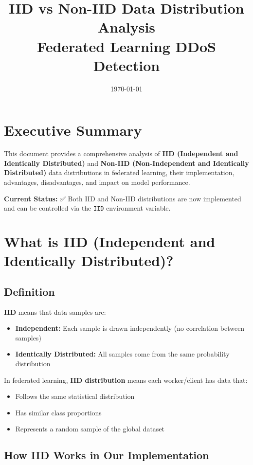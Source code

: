 \documentclass[12pt,a4paper]{article}
\title{IID vs Non-IID Data Distribution Analysis\\Federated Learning DDoS Detection}
\author{}
\date{\today}
\begin{document}
\maketitle

\section{Executive Summary}

This document provides a comprehensive analysis of \textbf{IID (Independent and Identically Distributed)} and \textbf{Non-IID (Non-Independent and Identically Distributed)} data distributions in federated learning, their implementation, advantages, disadvantages, and impact on model performance.

\textbf{Current Status:} ✅ Both IID and Non-IID distributions are now implemented and can be controlled via the \texttt{IID} environment variable.

\section{What is IID (Independent and Identically Distributed)?}

\subsection{Definition}

\textbf{IID} means that data samples are:
\begin{itemize}
    \item \textbf{Independent:} Each sample is drawn independently (no correlation between samples)
    \item \textbf{Identically Distributed:} All samples come from the same probability distribution
\end{itemize}

In federated learning, \textbf{IID distribution} means each worker/client has data that:
\begin{itemize}
    \item Follows the same statistical distribution
    \item Has similar class proportions
    \item Represents a random sample of the global dataset
\end{itemize}

\subsection{How IID Works in Our Implementation}
\end{document}
